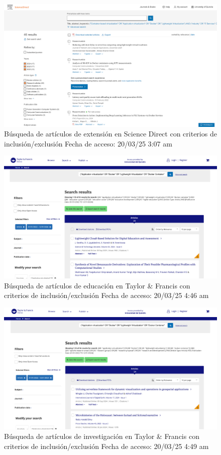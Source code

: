 \FloatBarrier\begin{figure}[H]
	\centering
	\includegraphics[width=\textwidth,keepaspectratio]{apendices/BD/criterios/SD-ind.png}
	\caption{Búsqueda de artículos de extensión en Science Direct con criterios de inclusión/exclusión
		Fecha de acceso: 20/03/25 3:07 am
	}\label{fig:busqueda27}
\end{figure}
\FloatBarrier\begin{figure}[H]
	\centering
	\includegraphics[width=\textwidth,keepaspectratio]{apendices/BD/criterios/TF-ed.png}
	\caption{Búsqueda de artículos de educación en Taylor \& Francis con criterios de inclusión/exclusión
		Fecha de acceso: 20/03/25 4:46 am
	}\label{fig:busqueda28}
\end{figure}
\FloatBarrier\begin{figure}[H]
	\centering
	\includegraphics[width=\textwidth,keepaspectratio]{apendices/BD/criterios/TF-inv.png}
	\caption{Búsqueda de artículos de investigación en Taylor \& Francis con criterios de inclusión/exclusión
		Fecha de acceso: 20/03/25 4:49 am
	}\label{fig:busqueda29}
\end{figure}
